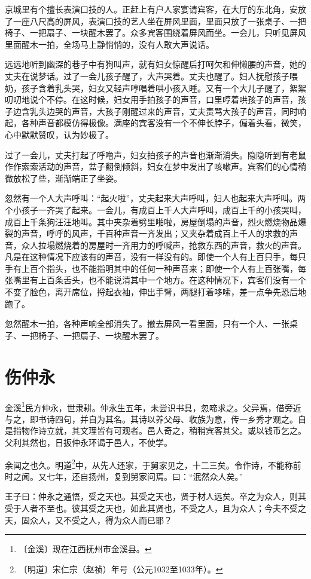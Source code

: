 \documentclass[12pt,UTF-8,openany,a4]{ctexbook}
\begin{document}
\begin{large}\yiwen
    
    京城里有个擅长表演口技的人。正赶上有户人家宴请宾客，在大厅的东北角，安放了一座八尺高的屏风，表演口技的艺人坐在屏风里面，里面只放了一张桌子、一把椅子、一把扇子、一块醒木罢了。众多宾客围绕着屏风而坐。一会儿，只听见屏风里面醒木一拍，全场马上静悄悄的，没有人敢大声说话。
    
    远远地听到幽深的巷子中有狗叫声，就有妇女惊醒后打呵欠和伸懒腰的声音，她的丈夫在说梦话。过了一会儿孩子醒了，大声哭着。丈夫也醒了。妇人抚慰孩子喂奶，孩子含着乳头哭，妇女又轻声哼唱着哄小孩入睡。又有一个大儿子醒了，絮絮叨叨地说个不停。在这时候，妇女用手拍孩子的声音，口里哼着哄孩子的声音，孩子边含乳头边哭的声音，大孩子刚醒过来的声音，丈夫责骂大孩子的声音，同时响起，各种声音都模仿得极像。满座的宾客没有一个不伸长脖子，偏着头看，微笑，心中默默赞叹，认为妙极了。
    
    过了一会儿，丈夫打起了呼噜声，妇女拍孩子的声音也渐渐消失。隐隐听到有老鼠作作索索活动的声音，盆子翻倒倾斜，妇女在梦中发出了咳嗽声。宾客们的心情稍微放松了些，渐渐端正了坐姿。
    
    忽然有一个人大声呼叫：“起火啦”，丈夫起来大声呼叫，妇人也起来大声呼叫。两个小孩子一齐哭了起来。一会儿，有成百上千人大声呼叫，成百上千的小孩哭叫，成百上千条狗汪汪地叫。其中夹杂着劈里啪啦，房屋倒塌的声音，烈火燃烧物品爆裂的声音，呼呼的风声，千百种声音一齐发出；又夹杂着成百上千人的求救的声音，众人拉塌燃烧着的房屋时一齐用力的呼喊声，抢救东西的声音，救火的声音。凡是在这种情况下应该有的声音，没有一样没有的。即使一个人有上百只手，每只手有上百个指头，也不能指明其中的任何一种声音来；即使一个人有上百张嘴，每张嘴里有上百条舌头，也不能说清其中一个地方。在这种情况下，宾客们没有一个不变了脸色，离开席位，捋起衣袖，伸出手臂，两腿打着哆嗦，差一点争先恐后地跑了。
    
    忽然醒木一拍，各种声响全部消失了。撤去屏风一看里面，只有一个人、一张桌子、一把椅子、一把扇子、一块醒木罢了。
    

\end{large}



\chapter{伤仲永}

\begin{large}
    
    金溪\footnote{〔金溪〕\yiwen 现在江西抚州市金溪县。}民方仲永，世隶耕。仲永生五年，未尝识书具，忽啼求之。父异焉，借旁近与之，即书诗四句，并自为其名。其诗以养父母、收族为意，传一乡秀才观之。自是指物作诗立就，其文理皆有可观者。邑人奇之，稍稍宾客其父。或以钱币乞之。父利其然也，日扳仲永环谒于邑人，不使学。
    
    余闻之也久。明道\footnote{〔明道〕\yiwen 宋仁宗（赵祯）年号（公元1032至1033年）。}中，从先人还家，于舅家见之，十二三矣。令作诗，不能称前时之闻。又七年，还自扬州，复到舅家问焉。曰：“泯然众人矣。”
    
    王子曰：仲永之通悟，受之天也。其受之天也，贤于材人远矣。卒之为众人，则其受于人者不至也。彼其受之天也，如此其贤也，不受之人，且为众人；今夫不受之天，固众人，又不受之人，得为众人而已耶？

\end{large}
\end{document}
